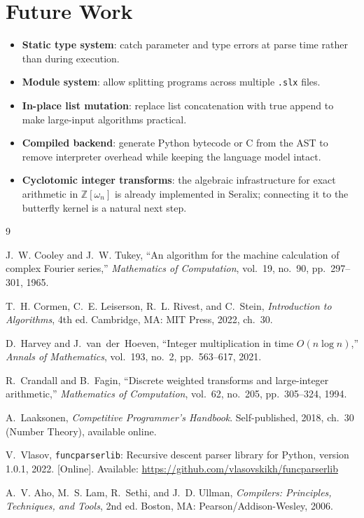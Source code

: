 \documentclass[conference]{IEEEtran}
\begin{document}
\section{Future Work}

\begin{itemize}
    \item \textbf{Static type system}: catch parameter and type errors at parse time rather than during execution.
    \item \textbf{Module system}: allow splitting programs across multiple \texttt{.slx} files.
    \item \textbf{In-place list mutation}: replace list concatenation with true append to make large-input algorithms practical.
    \item \textbf{Compiled backend}: generate Python bytecode or C from the AST to remove interpreter overhead while keeping the language model intact.
    \item \textbf{Cyclotomic integer transforms}: the algebraic infrastructure for exact arithmetic in $\mathbb{Z}[\omega_n]$ is already implemented in Seralix; connecting it to the butterfly kernel is a natural next step.
\end{itemize}

\begin{thebibliography}{9}

J.~W. Cooley and J.~W. Tukey,
``An algorithm for the machine calculation of complex Fourier series,''
\textit{Mathematics of Computation}, vol.~19, no.~90, pp.~297--301, 1965.

T.~H. Cormen, C.~E. Leiserson, R.~L. Rivest, and C.~Stein,
\textit{Introduction to Algorithms}, 4th ed.
Cambridge, MA: MIT Press, 2022, ch.~30.

D.~Harvey and J.~van~der~Hoeven,
``Integer multiplication in time $O(n \log n)$,''
\textit{Annals of Mathematics}, vol.~193, no.~2, pp.~563--617, 2021.

R.~Crandall and B.~Fagin,
``Discrete weighted transforms and large-integer arithmetic,''
\textit{Mathematics of Computation}, vol.~62, no.~205, pp.~305--324, 1994.

A.~Laaksonen,
\textit{Competitive Programmer's Handbook}.
Self-published, 2018, ch.~30 (Number Theory), available online.

V.~Vlasov,
\texttt{funcparserlib}: Recursive descent parser library for Python,
version 1.0.1, 2022.
[Online]. Available: \url{https://github.com/vlasovskikh/funcparserlib}

A.~V. Aho, M.~S. Lam, R.~Sethi, and J.~D. Ullman,
\textit{Compilers: Principles, Techniques, and Tools}, 2nd ed.
Boston, MA: Pearson/Addison-Wesley, 2006.

\end{thebibliography}
\end{document}
